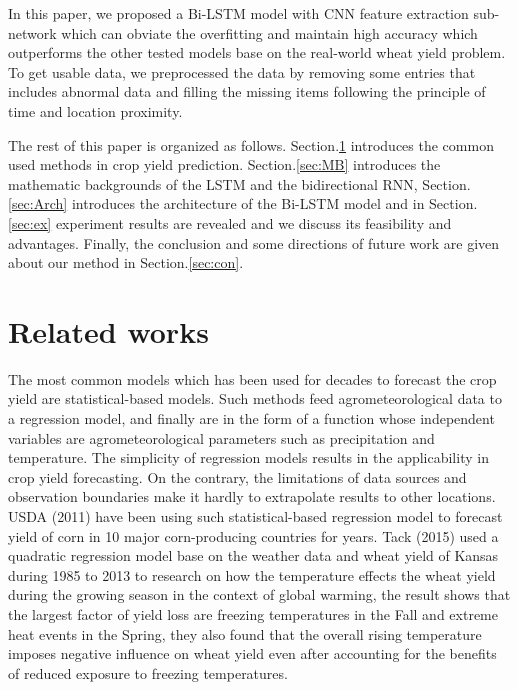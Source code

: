 \documentclass[conference, a4paper]{IEEEtran}
\begin{document}
  In this paper, we proposed a Bi-LSTM model with CNN feature extraction sub-network which can obviate the overfitting and maintain high accuracy which outperforms the other tested models base on the real-world wheat yield problem. To get usable data, we preprocessed the data by removing some entries that includes abnormal data and filling the missing items following the principle of time and location proximity. \par
  The rest of this paper is organized as follows. Section.\ref{sec:RW} introduces the common used methods in crop yield prediction. Section.\ref{sec:MB} introduces the mathematic backgrounds of the LSTM and the bidirectional RNN, Section.\ref{sec:Arch} introduces the architecture of the Bi-LSTM model and in Section.\ref{sec:ex} experiment results are revealed and we discuss its feasibility and advantages. Finally, the conclusion and some directions of future work are given about our method in Section.\ref{sec:con}.

\section{Related works} \label{sec:RW}

  The most common models which has been used for decades to forecast the crop yield are statistical-based models. Such methods feed agrometeorological data to a regression model, and finally are in the form of a function whose independent variables are agrometeorological parameters such as precipitation and temperature. The simplicity of regression models results in the applicability in crop yield forecasting. On the contrary, the limitations of data sources and observation boundaries make it hardly to extrapolate results to other locations. USDA (2011) \cite{goodUSDACornSoybean2011} have been using such statistical-based regression model to forecast yield of corn in 10 major corn-producing countries for years. Tack (2015)\cite{tackEffectWarmingTemperatures2015} used a quadratic regression model base on the weather data and wheat yield of Kansas during 1985 to 2013 to research on how the temperature effects the wheat yield during the growing season in the context of global warming, the result shows that the largest factor of yield loss are freezing temperatures in the Fall and extreme heat events in the Spring, they also found that the overall rising temperature imposes negative influence on wheat yield even after accounting for the benefits of reduced exposure to freezing temperatures. 
\end{document}
